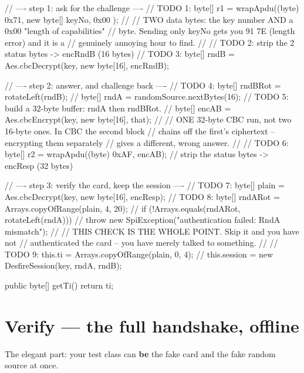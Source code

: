 \begin{jcode}
{{        // ---- step 1: ask for the challenge ----
        // TODO 1: byte[] r1 = wrapApdu((byte) 0x71, new byte[]{ keyNo, 0x00 });
        //
        //   TWO data bytes: the key number AND a 0x00 "length of capabilities"
        //   byte. Sending only keyNo gets you 91 7E (length error) and it is a
        //   genuinely annoying hour to find.
        //
        // TODO 2: strip the 2 status bytes -> encRndB (16 bytes)
        // TODO 3: byte[] rndB = Aes.cbcDecrypt(key, new byte[16], encRndB);

        // ---- step 2: answer, and challenge back ----
        // TODO 4: byte[] rndBRot = rotateLeft(rndB);
        //         byte[] rndA    = randomSource.nextBytes(16);
        // TODO 5: build a 32-byte buffer: rndA then rndBRot.
        //         byte[] encAB = Aes.cbcEncrypt(key, new byte[16], that);
        //
        //   ONE 32-byte CBC run, not two 16-byte ones. In CBC the second block
        //   chains off the first's ciphertext -- encrypting them separately
        //   gives a different, wrong answer.
        //
        // TODO 6: byte[] r2 = wrapApdu((byte) 0xAF, encAB);
        //         strip the status bytes -> encResp (32 bytes)

        // ---- step 3: verify the card, keep the session ----
        // TODO 7: byte[] plain = Aes.cbcDecrypt(key, new byte[16], encResp);
        // TODO 8: byte[] rndARot = Arrays.copyOfRange(plain, 4, 20);
        //         if (!Arrays.equals(rndARot, rotateLeft(rndA)))
        //             throw new SpiException("authentication failed: RndA mismatch");
        //
        //   THIS CHECK IS THE WHOLE POINT. Skip it and you have not
        //   authenticated the card -- you have merely talked to something.
        //
        // TODO 9: this.ti = Arrays.copyOfRange(plain, 0, 4);
        //         this.session = new DesfireSession(key, rndA, rndB);
    }

    public byte[] getTi() { return ti; }
}
\end{jcode}

\section{Verify --- the full handshake, offline}

The elegant part: your test class can \textbf{be} the fake card and the fake
random source at once.

